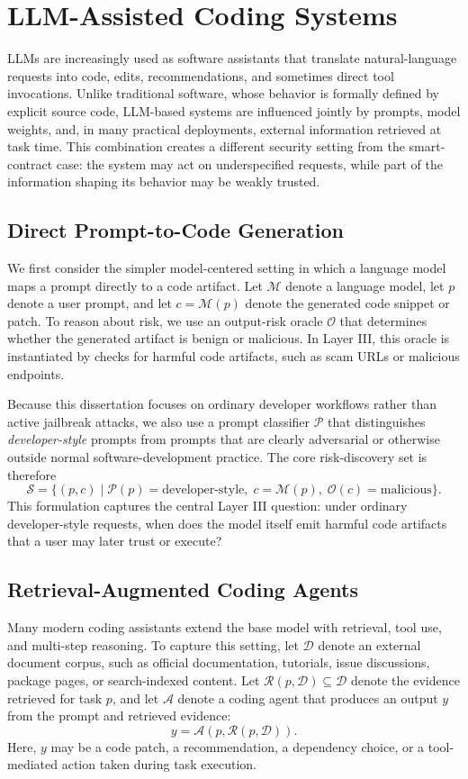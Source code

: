 \section{LLM-Assisted Coding Systems}
LLMs are increasingly used as software assistants
that translate natural-language requests into 
code, edits, recommendations,
and sometimes direct tool invocations.
Unlike traditional software, whose behavior is 
formally defined  by explicit source code,
LLM-based systems are influenced jointly by prompts, 
model weights,
and, in many practical deployments, external information 
retrieved at task time.
This combination creates a different security setting 
from the smart-contract case:
the system may act on underspecified requests,
while part of the information shaping its behavior may be weakly trusted.

\subsection{Direct Prompt-to-Code Generation}
We first consider the simpler model-centered setting
in which a language model
maps a prompt directly to a code artifact.
Let $\mathcal{M}$ denote a language model, 
let $p$ denote a user prompt,
and let $c=\mathcal{M}(p)$ denote the generated 
code snippet or patch.
To reason about risk, we use an output-risk 
oracle $\mathcal{O}$ that determines
whether the generated artifact is benign or malicious.
In Layer III, this oracle is instantiated by checks 
for harmful code artifacts,
such as scam URLs or malicious endpoints.

Because this dissertation focuses on ordinary 
developer workflows rather than
active jailbreak attacks, we also use a prompt 
classifier $\mathcal{P}$
that distinguishes \emph{developer-style} prompts 
from prompts that are
clearly adversarial or otherwise outside normal 
software-development practice.
The core risk-discovery set is therefore
\[
\mathcal{S}
=
\{(p,c)\mid \mathcal{P}(p)=\text{developer-style},\;
c=\mathcal{M}(p),\;
\mathcal{O}(c)=\text{malicious}\}.
\]
This formulation captures the central Layer III question:
under ordinary developer-style requests, when does the model itself emit
harmful code artifacts that a user may later trust or execute?

\subsection{Retrieval-Augmented Coding Agents}
Many modern coding assistants extend the base model with retrieval,
tool use, and multi-step reasoning.
To capture this setting, let $\mathcal{D}$ denote an external document corpus,
such as official documentation, tutorials, issue discussions, package pages,
or search-indexed content.
Let $\mathcal{R}(p,\mathcal{D}) \subseteq \mathcal{D}$ denote the evidence
retrieved for task $p$, and let $\mathcal{A}$ denote a coding agent that produces
an output $y$ from the prompt and retrieved evidence:
\[
y=\mathcal{A}(p,\mathcal{R}(p,\mathcal{D})).
\]
Here, $y$ may be a code patch, a recommendation, a dependency choice,
or a tool-mediated action taken during task execution.

